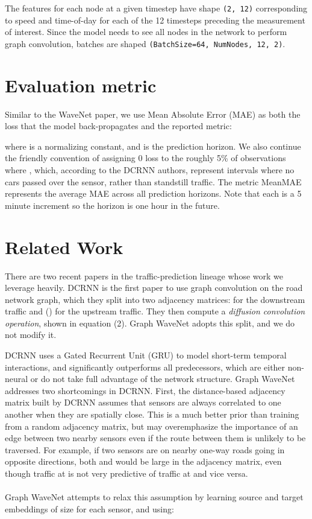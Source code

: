 \documentclass[10pt]{article}
\begin{document}
The features for each node at a given timestep have shape \texttt{(2, 12)} corresponding to speed and time-of-day for each of the 12 timesteps preceding the measurement of interest. Since the model needs to see all nodes in the network to perform graph convolution, batches are shaped \texttt{(BatchSize=64, NumNodes, 12, 2)}.


\section{Evaluation metric}
Similar to the WaveNet \citep{WaveNet} paper, we use Mean Absolute Error (MAE) as both the loss that the model back-propagates and the reported metric:

where  is a normalizing constant, and  is the prediction horizon. We also continue the friendly convention of assigning 0 loss to the roughly 5\% of observations where , which, according to the DCRNN authors, represent intervals where no cars passed over the sensor, rather than standstill traffic. The metric MeanMAE
 represents the average MAE across all prediction horizons. Note that each  is a 5 minute increment so the horizon  is one hour in the future.

\section{Related Work}
There are two recent papers in the traffic-prediction lineage whose work we leverage heavily. DCRNN \citep{li2018dcrnn_traffic} is the first paper to use graph convolution on the road network graph, which they split into two adjacency matrices:  for the downstream traffic and  () for the upstream traffic. 
They then compute a \textit{diffusion convolution operation}, shown in equation (2).  Graph WaveNet adopts this split, and we do not modify it.

DCRNN uses a Gated Recurrent Unit (GRU) to model short-term temporal interactions, and significantly outperforms all predecessors, which are either non-neural or do not take full advantage of the network structure.
Graph WaveNet \citep{gwn} addresses two shortcomings in DCRNN.
First, the distance-based adjacency matrix built by DCRNN assumes that sensors are always correlated to one another when they are spatially close. This is a much better prior than training from a random adjacency matrix, but may overemphasize the importance of an edge between two nearby sensors even if the route between them is unlikely to be traversed. For example, if two sensors are on nearby one-way roads going in opposite directions, both  and  would be large in the adjacency matrix, even though traffic at  is not very predictive of traffic at  and vice versa.\\\\
Graph WaveNet \citep{gwn} attempts to relax this assumption by learning source and target embeddings of size  for each sensor, and using:\\
\end{document}
